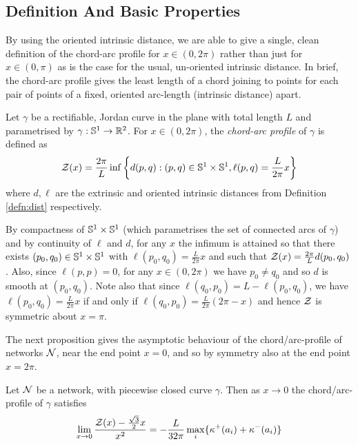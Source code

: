\documentclass[12pt]{amsart}
\begin{document}
\subsection{Definition And Basic Properties}
\label{sec:orgheadline7}

By using the oriented intrinsic distance, we are able to give a single, clean definition of the chord-arc profile for \(x \in (0, 2\pi)\) rather than just for \(x \in (0, \pi)\) as is the case for the usual, un-oriented intrinsic distance. In brief, the chord-arc profile gives the least length of a chord joining to points for each pair of points of a fixed, oriented arc-length (intrinsic distance) apart.

\begin{defn}
Let \(\gamma\) be a rectifiable, Jordan curve in the plane with total length \(L\) and parametrised by \(\gamma: \mathbb{S}^1 \to \mathbb{R}^2\). For \(x\in (0, 2\pi)\), the \emph{chord-arc profile} of \(\gamma\) is defined as
\[
\operatorname{\mathcal{Z}} (x) = \frac{2\pi}{L} \inf\left\{d(p, q): (p,q) \in \mathbb{S}^1\times\mathbb{S}^1, \ell(p,q) = \frac{L}{2\pi} x\right\}
\]
where \(d, \ell\) are the extrinsic and oriented intrinsic distances from Definition \ref{defn:dist} respectively.
\end{defn}

\begin{remark}
By compactness of \(\mathbb{S}^1\times \mathbb{S}^1\) (which parametrises the set of connected arcs of \(\gamma\)) and by continuity of \(\ell\) and \(d\), for any \(x\) the infimum is attained so that there exists \((p_0,q_0) \in \mathbb{S}^1 \times \mathbb{S}^1\) with \(\ell(p_0, q_0) = \frac{L}{2\pi}x\) and such that \(\operatorname{\mathcal{Z}}(x) = \frac{2\pi}{L} d(p_0, q_0)\). Also, since \(\ell(p,p) = 0\), for any \(x\in(0,2\pi)\) we have \(p_0 \ne q_0\) and so \(d\) is smooth at \((p_0, q_0)\). Note also that since \(\ell(q_0, p_0) = L - \ell(p_0, q_0)\), we have \(\ell(p_0, q_0) = \tfrac{L}{2\pi}x\) if and only if \(\ell(q_0, p_0) = \frac{L}{2\pi}(2\pi - x)\) and hence \(\operatorname{\mathcal{Z}}\) is symmetric about \(x = \pi\).
\end{remark}

The next proposition gives the asymptotic behaviour of the chord/arc-profile of networks \(\operatorname{\mathcal{N}}\), near the end point \(x=0\), and so by symmetry also at the end point \(x=2\pi\).

\begin{prop}
\label{prop:asymptotics}
Let \(\operatorname{\mathcal{N}}\) be a network, with piecewise closed curve \(\gamma\). Then as \(x\to 0\) the chord/arc-profile of \(\gamma\) satisfies
\[
\lim_{x\to 0} \frac{\operatorname{\mathcal{Z}}(x) - \tfrac{\sqrt{3}}{2}x}{x^2} = - \frac{L}{32\pi} \max_i \{\operatorname{\kappa}^+(a_i) + \operatorname{\kappa}^-(a_i)\}
\]
\end{prop}
\end{document}

